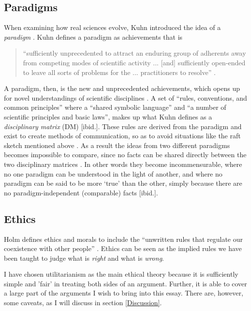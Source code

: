 \documentclass{article}
\begin{document}
\subsection{Paradigms} \label{Theory:Paradigms}
When examining how real sciences evolve, Kuhn introduced the idea of a \textit{paradigm} \citep[p. 59]{Holm:2014}. Kuhn defines a paradigm as achievements that is
\begin{quote}
``sufficiently unprecedented to attract an enduring group of adherents away from competing modes of scientific activity ... [and] sufficiently open-ended to leave all sorts of problems for the ... practitioners to resolve'' \citep[p. 10-11]{Kuhn:2012}.
\end{quote}
A paradigm, then, is the new and unprecedented achievements, which opens up for novel understandings of scientific disciplines \citep[p. 61]{Holm:2014}. A set of ``rules, conventions, and common principles'' where a ``shared symbolic language'' and ``a number of scientific principles and basic laws'', makes up what Kuhn defines as a \textit{disciplinary matrix} (DM) [ibid.]. These rules are derived from the paradigm and exist to create methods of communication, so as to avoid situations like the raft sketch mentioned above \citep[p. 181]{Kuhn:2012}. As a result the ideas from two different paradigms becomes impossible to compare, since no facts can be shared directly between the two disciplinary matrices \citep[p. 66]{Holm:2014}. In other words they become incommensurable, where no one paradigm can be understood in the light of another, and where no paradigm can be said to be more `true' than the other, simply because there are no paradigm-independent (comparable) facts [ibid.].

\subsection{Ethics}
Holm defines ethics and morals to include the ``unwritten rules that regulate our coexistence with other people'' \citep[p. 205]{ibid.}. Ethics can be seen as the implied rules we have been taught to judge what is \textit{right} and what is \textit{wrong}.

I have chosen utilitarianism as the main ethical theory because it is sufficiently simple and 'fair' in treating both sides of an argument. Further, it is able to cover a large part of the arguments I wish to bring into this essay. There are, however, some caveats, as I will discuss in section \ref{Discussion}.
\end{document}
